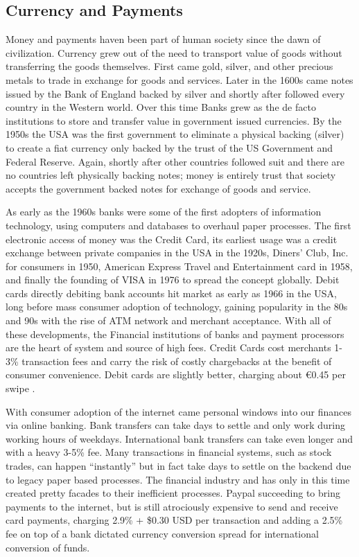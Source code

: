 \documentclass[a4paper,12pt]{article} %
\begin{document}
\subsection{Currency and Payments} \label{ssec:2:finance}

Money and payments haven been part of human society since the dawn of civilization. Currency grew out of the need to transport value of goods without transferring the goods themselves. First came gold, silver, and other precious metals to trade in exchange for goods and services. Later in the 1600s came notes issued by the Bank of England backed by silver and shortly after followed every country in the Western world. Over this time Banks grew as the de facto institutions to store and transfer value in government issued currencies. By the 1950s the USA was the first government to eliminate a physical backing (silver) to create a fiat currency only backed by the trust of the US Government and Federal Reserve. Again, shortly after other countries followed suit and there are no countries left physically backing notes; money is entirely trust that society accepts the government backed notes for exchange of goods and service.

As early as the 1960s banks were some of the first adopters of information technology, using computers and databases to overhaul paper processes. The first electronic access of money was the Credit Card, its earliest usage was a credit exchange between private companies in the USA in the 1920s, Diners’ Club, Inc. for consumers in 1950, American Express Travel and Entertainment card in 1958, and finally the founding of VISA in 1976 to spread the concept globally\cite{britannica2016creditcard}. Debit cards directly debiting bank accounts hit market as early as 1966 in the USA, long before mass consumer adoption of technology, gaining popularity in the 80s and 90s with the rise of ATM network and merchant acceptance\cite{collins2011debitcard}. With all of these developments, the Financial institutions of banks and payment processors are the heart of system and source of high fees. Credit Cards cost  merchants 1-3\% transaction fees and carry the risk of costly chargebacks at the benefit of consumer convenience. Debit cards are slightly better, charging about \euro0.45 per swipe \cite{kaarmann2014government}.

With consumer adoption of the internet came personal windows into our finances via online banking. Bank transfers can take days to settle and only work during working hours of weekdays. International bank transfers can take even longer and with a heavy 3-5\% fee.  Many transactions in financial systems, such as stock trades, can happen ``instantly'' but in fact take days to settle on the backend due to legacy paper based processes. The financial industry and has only in this time created pretty facades to their inefficient processes. Paypal succeeding to bring payments to the internet, but is still atrociously expensive to send and receive card payments, charging 2.9\% + \$0.30 USD per transaction and adding a 2.5\% fee on top of a bank dictated currency conversion spread for international conversion of funds\cite{paypal2017fees}.
\end{document}
